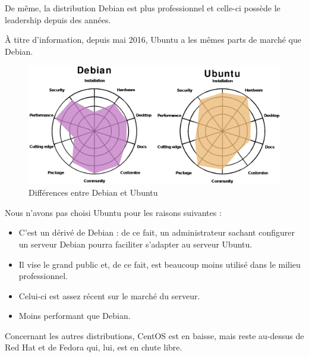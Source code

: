 De même, la distribution Debian est plus professionnel et celle-ci possède le
leadership depuis des années.

À titre d'information, depuis mai 2016, Ubuntu a les mêmes parts de marché que
Debian.


\begin{figure}[!h]
    \centering
    \includegraphics[scale=0.4]
    {textures/images/installation/DebianVsUbuntu.eps}
    \caption{Différences entre Debian et Ubuntu}
     \label{fig:diff-debian-ubuntu}
  \end{figure}

Nous n'avons pas choisi Ubuntu pour les raisons suivantes :

\begin{itemize}
\item C'est un dérivé de Debian : de ce fait, un administrateur sachant
  configurer un serveur Debian pourra faciliter s'adapter au serveur Ubuntu.

\item Il vise le grand public et, de ce fait, est beaucoup moins utilisé
  dans le milieu professionnel.

\item Celui-ci est assez récent sur le marché du serveur.

\item Moins performant que Debian.
\end{itemize}

Concernant les autres distributions, CentOS est en baisse, mais reste au-dessus
de Red Hat et de Fedora qui, lui, est en chute libre.

\vspace{1cm}

